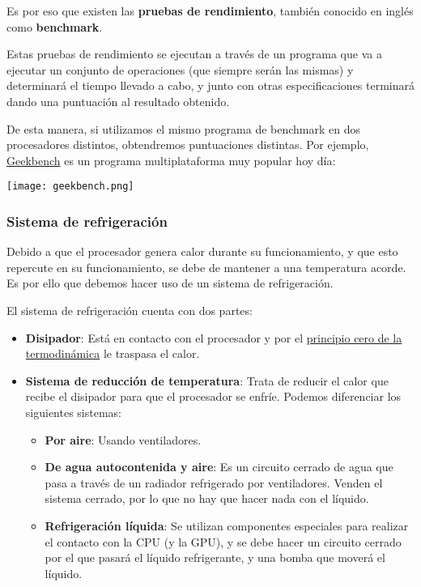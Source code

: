 
Es por eso que existen las \textbf{pruebas de rendimiento}, también conocido en inglés como \textbf{benchmark}.

Estas pruebas de rendimiento se ejecutan a través de un programa que va a ejecutar un conjunto de operaciones (que siempre serán las mismas) y determinará el tiempo llevado a cabo, y junto con otras especificaciones terminará dando una puntuación al resultado obtenido.

De esta manera, si utilizamos el mismo programa de benchmark en dos procesadores distintos, obtendremos puntuaciones distintas. Por ejemplo, \href{https://www.geekbench.com/}{Geekbench} es un programa multiplataforma muy popular hoy día:

\begin{center}
    \texttt{[image: geekbench.png]}
\end{center}


\subsubsection{Sistema de refrigeración}
Debido a que el procesador genera calor durante su funcionamiento, y que esto repercute en su funcionamiento, se debe de mantener a una temperatura acorde. Es por ello que debemos hacer uso de un sistema de refrigeración.

El sistema de refrigeración cuenta con dos partes:
\begin{itemize}
    \item \textbf{Disipador}: Está en contacto con el procesador y por el \href{https://es.wikipedia.org/wiki/Principio_cero_de_la_termodin%C3%A1mica}{principio cero de la termodinámica} le traspasa el calor.
    \item \textbf{Sistema de reducción de temperatura}: Trata de reducir el calor que recibe el disipador para que el procesador se enfríe. Podemos diferenciar los siguientes sistemas:
    \begin{itemize}
        \item \textbf{Por aire}: Usando ventiladores.
        \item \textbf{De agua autocontenida y aire}: Es un circuito cerrado de agua que pasa a través de un radiador refrigerado por ventiladores. Venden el sistema cerrado, por lo que no hay que hacer nada con el líquido.
        \item \textbf{Refrigeración líquida}: Se utilizan componentes especiales para realizar el contacto con la CPU (y la GPU), y se debe hacer un circuito cerrado por el que pasará el líquido refrigerante, y una bomba que moverá el líquido.
    \end{itemize}
\end{itemize}

